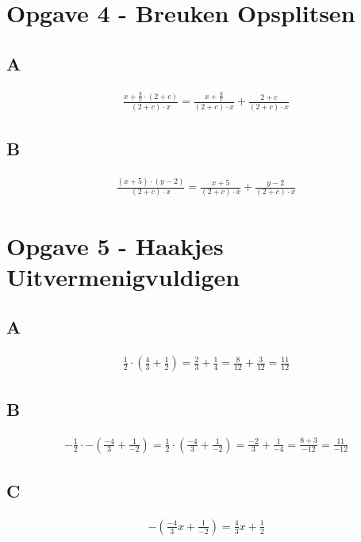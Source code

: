 \documentclass[fleqn]{article}
\begin{document}
\clearpage
\section{Opgave 4 - Breuken Opsplitsen}

\subsection{A}
\begin{align*}
    \frac{x+\frac{y}{x}\cdot(2+c)}{(2+c)\cdot x} = \frac{x+\frac{y}{x}}{(2+c)\cdot x} + \frac{2+c}{(2+c)\cdot x}
\end{align*}

\subsection{B}
\begin{align*}
    \frac{(x+5)\cdot(y-2)}{(2+c)\cdot x} = \frac{x+5}{(2 + c) \cdot x} + \frac{y-2}{(2 + c) \cdot x}
\end{align*}

\clearpage 
\section{Opgave 5 - Haakjes Uitvermenigvuldigen}
\subsection{A}
\begin{align*}
    \frac{1}{2} \cdot (\frac{4}{3} + \frac{1}{2}) = \frac{2}{3} + \frac{1}{4} = \frac{8}{12} + \frac{3}{12} = \frac{11}{12}
\end{align*}

\subsection{B}
\begin{align*}
    -\frac{1}{2} \cdot - ( \frac{-4}{3}+\frac{1}{-2}) = \frac{1}{2} \cdot (\frac{-4}{3}+\frac{1}{-2}) = \frac{-2}{3} + \frac{1}{-4} = \frac{8+3}{-12} = \frac{11}{-12}
\end{align*}

\subsection{C}
\begin{align*}
    -(\frac{-4}{3}x + \frac{1}{-2}) = \frac{4}{3}x + \frac{1}{2} 
\end{align*}
     
\end{document}
